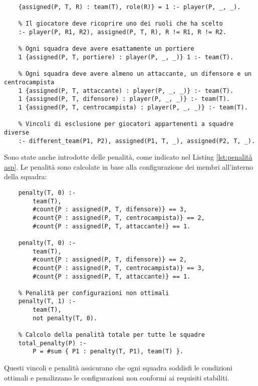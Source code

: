\documentclass{article}
\begin{document}
\begin{multicols*}{2}
\begin{lstlisting}[style=minizinc, caption={Vincoli ASP}, label={lst:aspVincoli}]
    % Assegnazione di un giocatore a una squadra e a un ruolo
    {assigned(P, T, R) : team(T), role(R)} = 1 :- player(P, _, _).
    
    % Il giocatore deve ricoprire uno dei ruoli che ha scelto
    :- player(P, R1, R2), assigned(P, T, R), R != R1, R != R2.
    
    % Ogni squadra deve avere esattamente un portiere
    1 {assigned(P, T, portiere) : player(P, _, _)} 1 :- team(T).
    
    % Ogni squadra deve avere almeno un attaccante, un difensore e un centrocampista
    1 {assigned(P, T, attaccante) : player(P, _, _)} :- team(T).
    1 {assigned(P, T, difensore) : player(P, _, _)} :- team(T).
    1 {assigned(P, T, centrocampista) : player(P, _, _)} :- team(T).
    
    % Vincoli di esclusione per giocatori appartenenti a squadre diverse
    :- different_team(P1, P2), assigned(P1, T, _), assigned(P2, T, _).
\end{lstlisting}
Sono state anche introdotte delle penalità, 
come indicato nel Listing \ref{lst:penalità asp}. 
Le penalità sono calcolate in base alla configurazione dei membri all'interno della squadra:

\begin{lstlisting}[style=minizinc, caption={Penalità ASP}, label={lst:penalità asp}]
    % Calcolo delle penalità per configurazioni ottimali
    penalty(T, 0) :- 
        team(T),
        #count{P : assigned(P, T, difensore)} == 3, 
        #count{P : assigned(P, T, centrocampista)} == 2, 
        #count{P : assigned(P, T, attaccante)} == 1.
    
    penalty(T, 0) :- 
        team(T),
        #count{P : assigned(P, T, difensore)} == 2, 
        #count{P : assigned(P, T, centrocampista)} == 3, 
        #count{P : assigned(P, T, attaccante)} == 1.
    
    % Penalità per configurazioni non ottimali
    penalty(T, 1) :- 
        team(T),
        not penalty(T, 0).
    
    % Calcolo della penalità totale per tutte le squadre
    total_penalty(P) :- 
        P = #sum { P1 : penalty(T, P1), team(T) }.
\end{lstlisting}
Questi vincoli e penalità assicurano che ogni squadra soddisfi le condizioni ottimali 
e penalizzano le configurazioni non conformi ai requisiti stabiliti.



\end{multicols*}
\end{document}
